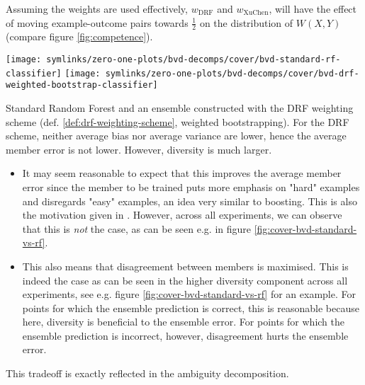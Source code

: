 \documentclass[../main.tex]{subfiles}
\begin{document}
Assuming the weights are used effectively, $w_{\text{DRF}}$ and $w_{\text{XuChen}}$, will have the effect of moving example-outcome pairs towards $\frac{1}{2}$ on the distribution of $W(X,Y)$ (compare figure \ref{fig:competence}). 
\begin{marginfigure}
    \texttt{[image: symlinks/zero-one-plots/bvd-decomps/cover/bvd-standard-rf-classifier]}
    \texttt{[image: symlinks/zero-one-plots/bvd-decomps/cover/bvd-drf-weighted-bootstrap-classifier]}
    \caption{
        Standard Random Forest and an ensemble constructed with the DRF weighting scheme (def. \ref{def:drf-weighting-scheme}, weighted bootstrapping). For the DRF scheme, neither average bias nor average variance are lower, hence the average member error is not lower. However, diversity is much larger.
    }
    \label{fig:cover-bvd-standard-vs-drf}
\end{marginfigure}
\begin{itemize}
    \item It may seem reasonable to expect that this improves the average member error since the member to be trained puts more emphasis on "hard" examples and disregards "easy" examples, an idea very similar to boosting. This is also the motivation given in \cite{bernard_DynamicRandomForests_2012, xu_ImplementationPerformanceOptimization_2017}. However, across all experiments, we can observe that this is \textit{not} the case, as can be seen e.g. in figure \ref{fig:cover-bvd-standard-vs-rf}.
    \item This also means that disagreement between members is maximised. This is indeed the case as can be seen in the higher diversity component across all experiments, see e.g. figure \ref{fig:cover-bvd-standard-vs-rf} for an example. For points for which the ensemble prediction is correct, this is reasonable because here, diversity is beneficial to the ensemble error. For points for which the ensemble prediction is incorrect, however, disagreement hurts the ensemble error.
\end{itemize}
This tradeoff is exactly reflected in the ambiguity decomposition.
\end{document}
